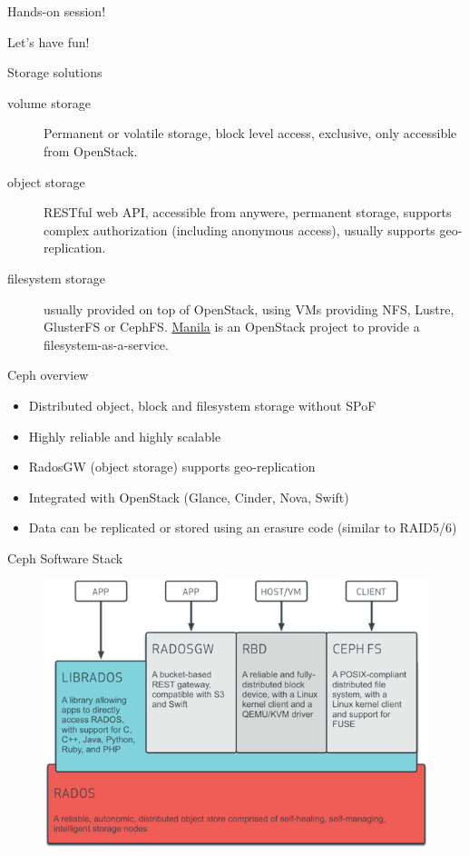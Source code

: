 \documentclass[english,serif,mathserif,usenames,dvipsnames]{beamer}
\begin{document}
\begin{frame}
  {Hands-on session!}

  \large Let's have fun!
\end{frame}

\begin{frame}
  {Storage solutions}

  \begin{description}
  \item[volume storage] Permanent or volatile storage, block level
    access, exclusive, only accessible from OpenStack.
  \item[object storage] RESTful web API, accessible from anywere,
    permanent storage, supports complex authorization (including
    anonymous access), usually supports geo-replication.
  \item[filesystem storage] usually provided on top of OpenStack,
    using VMs providing NFS, Lustre, GlusterFS or
    CephFS. \href{https://wiki.openstack.org/wiki/Manila}{Manila} is
    an OpenStack project to provide a filesystem-as-a-service.
  \end{description}
\end{frame}

\begin{frame}
  {Ceph overview}
  \begin{itemize}
  \item Distributed object, block and filesystem storage without SPoF
  \item Highly reliable and highly scalable
  \item RadosGW (object storage) supports geo-replication
  \item Integrated with OpenStack (Glance, Cinder, Nova, Swift)
  \item Data can be replicated or stored using an erasure code
    (similar to RAID5/6)
  \end{itemize}
\end{frame}

\begin{frame}
  {Ceph Software Stack}
  \begin{figure}[ht]
    \centering
    \includegraphics[width=\linewidth]{ceph-software-stack.png}
  \end{figure}
\end{frame}
\end{document}
